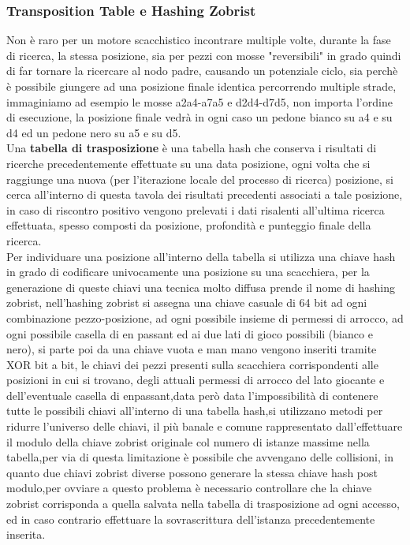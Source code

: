 \subsubsection{Transposition Table e Hashing Zobrist}
Non è raro per un motore scacchistico incontrare multiple volte, durante la fase di ricerca, la stessa posizione, sia per pezzi con mosse "reversibili" in grado quindi di far tornare la ricercare al nodo padre,
causando un potenziale ciclo, sia perchè è possibile giungere ad una posizione finale identica percorrendo multiple strade, immaginiamo ad esempio le mosse a2a4-a7a5 e d2d4-d7d5, non importa l'ordine di esecuzione,
la posizione finale vedrà in ogni caso un pedone bianco su a4 e su d4 ed un pedone nero su a5 e su d5.
\\ Una \textbf{tabella di trasposizione} è una tabella hash che conserva i risultati di ricerche precedentemente effettuate
su una data posizione, ogni volta che si raggiunge una nuova (per l'iterazione locale del processo di ricerca) posizione, si cerca all'interno di questa tavola dei risultati precedenti associati a tale posizione, in caso di riscontro positivo
vengono prelevati i dati risalenti all'ultima ricerca effettuata, spesso composti da posizione, profondità e punteggio finale della ricerca.
\\Per individuare una posizione all'interno della tabella si utilizza una chiave hash in grado di codificare univocamente una posizione su una scacchiera, per la generazione di queste chiavi una tecnica molto diffusa prende il nome di hashing zobrist, 
nell'hashing zobrist si assegna una chiave casuale di 64 bit ad ogni combinazione pezzo-posizione, ad ogni possibile insieme di permessi di arrocco, ad ogni possibile casella di en passant ed ai due lati di gioco possibili (bianco e nero),
si parte poi da una chiave vuota e man mano vengono inseriti tramite XOR bit a bit, le chiavi dei pezzi presenti sulla scacchiera corrispondenti alle posizioni in cui si trovano, degli attuali permessi di arrocco
del lato giocante e dell'eventuale casella di enpassant,data però data l'impossibilità di contenere tutte le possibili chiavi all'interno di una tabella hash,si utilizzano metodi per ridurre l'universo delle chiavi,
il più banale e comune rappresentato dall'effettuare il modulo della chiave zobrist originale col numero di istanze massime nella tabella,per via di questa limitazione è possibile che avvengano delle collisioni,
in quanto due chiavi zobrist diverse possono generare la stessa chiave hash post modulo,per ovviare a questo problema è necessario controllare che la chiave zobrist corrisponda a quella salvata nella tabella di 
trasposizione ad ogni accesso, ed in caso contrario effettuare la sovrascrittura dell'istanza precedentemente inserita.



